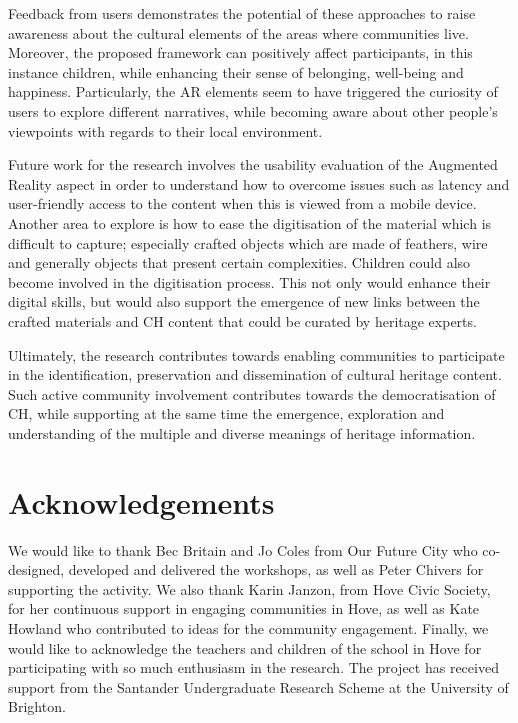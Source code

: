 \documentclass[acmlarge,screen,dvipsnames]{acmart}
\begin{document}
Feedback from users demonstrates the potential of these approaches to raise
awareness about the cultural elements of the areas where communities live. Moreover, the proposed framework can positively affect participants, in this instance children, while enhancing their sense of belonging, well-being and happiness. Particularly, the AR elements seem to have triggered the curiosity of users to explore different narratives, while becoming aware about other people's viewpoints with regards to their local environment.

Future work for the research involves the usability evaluation of the Augmented Reality aspect
in order to understand how to overcome issues such as latency and
user-friendly access to the content when this is viewed from a mobile device.
Another area to explore is how to ease the digitisation of the material which is difficult to capture; especially crafted objects which are made of feathers, wire and generally objects that present certain complexities. Children could also
become involved in the digitisation process. This not only would enhance their digital
skills, but would also support the emergence of new links between the crafted materials and
CH content that could be curated by heritage experts. 

   

Ultimately, the research contributes towards enabling communities to
participate in the identification, preservation and dissemination of cultural heritage content. Such active community involvement contributes towards the democratisation of CH, while supporting at the same time the emergence, exploration and understanding of the multiple and diverse meanings of heritage information.


\section{Acknowledgements} We would like to thank Bec Britain and Jo Coles
from Our Future City who co-designed, developed and delivered the workshops, as
well as Peter Chivers for supporting the activity. We also thank Karin Janzon,
from Hove Civic Society, for her continuous support in engaging communities in
Hove, as well as Kate Howland who contributed to ideas for the community engagement. 
Finally, we would like to acknowledge the teachers and children of the
school in Hove for participating with so much enthusiasm in the research. 
The project has received support from the Santander Undergraduate Research Scheme
at the University of Brighton.
\end{document}
